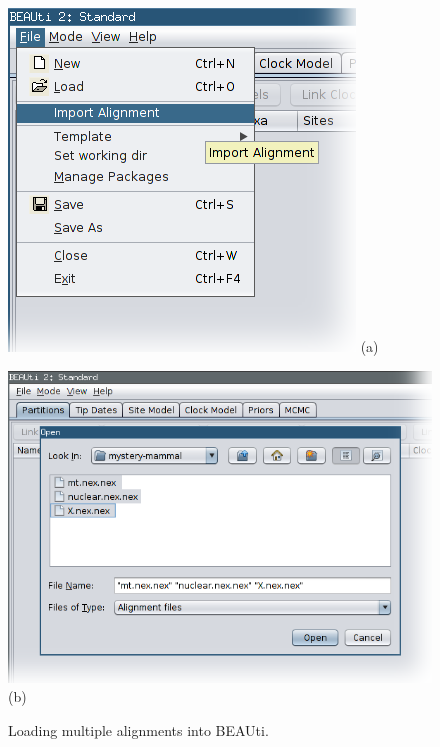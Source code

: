 \documentclass[a4paper,11pt]{article}
\begin{document}
\begin{figure}[h!]
    \centering
    \hspace{-0.5cm}\begin{minipage}[b]{0.4\textwidth}
        \begin{center}
            \includegraphics[width=\textwidth]{figures/import_alignment.png}
            (a)
        \end{center}
    \end{minipage}\hspace{0.5cm}\begin{minipage}[b]{0.6\textwidth}
        \begin{center}
            \includegraphics[width=\textwidth]{figures/import_alignment2.png}
            (b)
        \end{center}
    \end{minipage}
    \caption{Loading multiple alignments into BEAUti.}
    \label{fig:importAlignment}
\end{figure}
\end{document}
